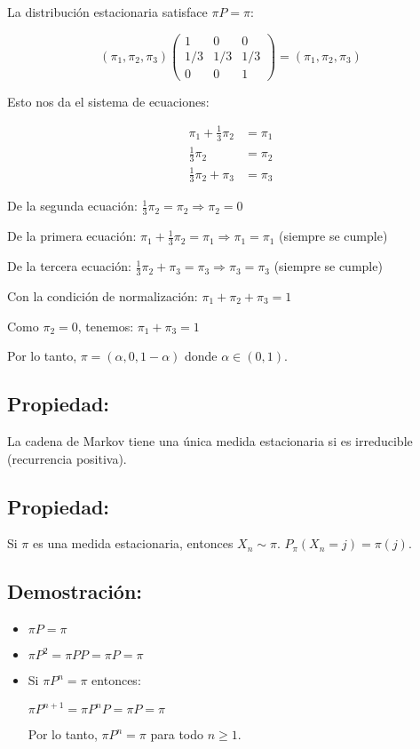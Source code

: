 \documentclass[12pt,a4paper]{article}
\begin{document}
La distribución estacionaria satisface $\pi P = \pi$:

\begin{equation*}
(\pi_1, \pi_2, \pi_3) \begin{pmatrix}
1 & 0 & 0 \\
1/3 & 1/3 & 1/3 \\
0 & 0 & 1
\end{pmatrix} = (\pi_1, \pi_2, \pi_3)
\end{equation*}

Esto nos da el sistema de ecuaciones:

\begin{align*}
\pi_1 + \frac{1}{3} \pi_2 &= \pi_1 \\
\frac{1}{3} \pi_2 &= \pi_2 \\
\frac{1}{3} \pi_2 + \pi_3 &= \pi_3
\end{align*}

De la segunda ecuación: $\frac{1}{3} \pi_2 = \pi_2 \Rightarrow \pi_2 = 0$

De la primera ecuación: $\pi_1 + \frac{1}{3} \pi_2 = \pi_1 \Rightarrow \pi_1 = \pi_1$ (siempre se cumple)

De la tercera ecuación: $\frac{1}{3} \pi_2 + \pi_3 = \pi_3 \Rightarrow \pi_3 = \pi_3$ (siempre se cumple)

Con la condición de normalización: $\pi_1 + \pi_2 + \pi_3 = 1$

Como $\pi_2 = 0$, tenemos: $\pi_1 + \pi_3 = 1$

Por lo tanto, $\pi = (\alpha, 0, 1-\alpha)$ donde $\alpha \in (0,1)$.

\subsection*{Propiedad:} 
La cadena de Markov tiene una única medida estacionaria si es irreducible (recurrencia positiva).

\subsection*{Propiedad:} 
Si $\pi$ es una medida estacionaria, entonces $X_n \sim \pi$. $P_{\pi}(X_n=j) = \pi(j)$.

\subsection*{Demostración:}

\begin{itemize}
    \item $\pi P = \pi$
    \item $\pi P^2 = \pi P P = \pi P = \pi$
    \item Si $\pi P^n = \pi$ entonces:
    
    $\pi P^{n+1} = \pi P^n P = \pi P = \pi$
    
    Por lo tanto, $\pi P^n = \pi$ para todo $n \geq 1$.
\end{itemize}
\end{document}
